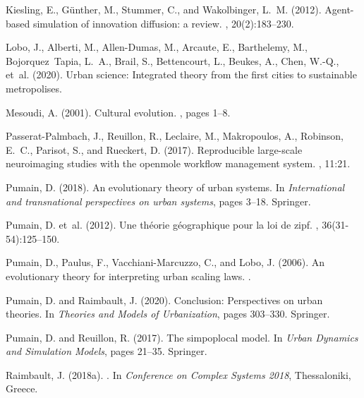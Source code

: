 \documentclass[letterpaper]{article}
\begin{document}
\begin{thebibliography}{}
Kiesling, E., G{\"u}nther, M., Stummer, C., and Wakolbinger, L.~M. (2012).
\newblock Agent-based simulation of innovation diffusion: a review.
,
  20(2):183--230.

Lobo, J., Alberti, M., Allen-Dumas, M., Arcaute, E., Barthelemy, M.,
  Bojorquez~Tapia, L.~A., Brail, S., Bettencourt, L., Beukes, A., Chen, W.-Q.,
  et~al. (2020).
\newblock Urban science: Integrated theory from the first cities to sustainable
  metropolises.

Mesoudi, A. (2001).
\newblock Cultural evolution.
, pages 1--8.

Passerat-Palmbach, J., Reuillon, R., Leclaire, M., Makropoulos, A., Robinson,
  E.~C., Parisot, S., and Rueckert, D. (2017).
\newblock Reproducible large-scale neuroimaging studies with the openmole
  workflow management system.
, 11:21.

Pumain, D. (2018).
\newblock An evolutionary theory of urban systems.
\newblock In {\em International and transnational perspectives on urban
  systems}, pages 3--18. Springer.

Pumain, D. et~al. (2012).
\newblock Une th{\'e}orie g{\'e}ographique pour la loi de zipf.
, 36(31-54):125--150.

Pumain, D., Paulus, F., Vacchiani-Marcuzzo, C., and Lobo, J. (2006).
\newblock An evolutionary theory for interpreting urban scaling laws.
.

Pumain, D. and Raimbault, J. (2020).
\newblock Conclusion: Perspectives on urban theories.
\newblock In {\em Theories and Models of Urbanization}, pages 303--330.
  Springer.

Pumain, D. and Reuillon, R. (2017).
\newblock The simpoplocal model.
\newblock In {\em Urban Dynamics and Simulation Models}, pages 21--35.
  Springer.

Raimbault, J. (2018a).
.
\newblock In {\em {Conference on Complex Systems 2018}}, Thessaloniki, Greece.


\end{thebibliography}
\end{document}

